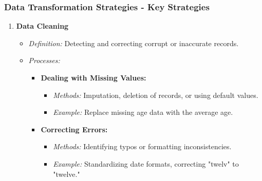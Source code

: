 \documentclass[aspectratio=169]{beamer}
\begin{document}
\begin{frame}[fragile]
    \frametitle{Data Transformation Strategies - Key Strategies}
    \begin{enumerate}
        \item \textbf{Data Cleaning}
        \begin{itemize}
            \item \textit{Definition:} Detecting and correcting corrupt or inaccurate records.
            \item \textit{Processes:}
            \begin{itemize}
                \item \textbf{Dealing with Missing Values:}
                \begin{itemize}
                    \item \textit{Methods:} Imputation, deletion of records, or using default values.
                    \item \textit{Example:} Replace missing age data with the average age.
                \end{itemize}
                \item \textbf{Correcting Errors:}
                \begin{itemize}
                    \item \textit{Methods:} Identifying typos or formatting inconsistencies.
                    \item \textit{Example:} Standardizing date formats, correcting "twelv" to "twelve."
                \end{itemize}
            \end{itemize}
        \end{itemize}
        

\end{enumerate}
\end{frame}
\end{document}
